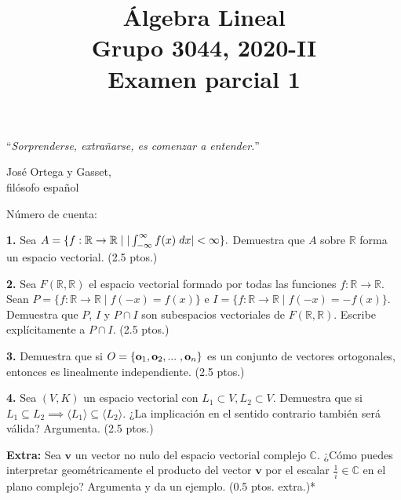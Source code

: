\documentclass[a4paper]{article}
\begin{document}
\title{Álgebra Lineal \\ Grupo 3044, 2020-II \\ Examen parcial 1}
\date{}
\maketitle

\epigraph{``\textit{Sorprenderse, extrañarse, es comenzar a entender.}''}{\textemdash José Ortega y Gasset, \\ filósofo español}

Número de cuenta:

\vspace{5mm}

\textbf{1.} Sea $A=\{f:\mathbb{R}\to\mathbb{R}\mid |\int_{-\infty}^{\infty} f(x)\hspace{1mm} dx| < \infty \}.$ Demuestra que $A$ sobre $\mathbb{R}$ forma un espacio vectorial. (2.5 ptos.)

\vspace{5mm}

\textbf{2.} Sea $F(\mathbb{R},\mathbb{R})$ el espacio vectorial formado por todas las funciones $f:\mathbb{R}\to \mathbb{R}$. Sean $P=\{f:\mathbb{R}\to \mathbb{R}\mid f(-x) = f(x)\}$ e $I=\{f:\mathbb{R}\to \mathbb{R}\mid f(-x)=-f(x)\}$. Demuestra que $P$, $I$ y $P\cap I$ son subespacios vectoriales de $F(\mathbb{R},\mathbb{R})$. Escribe explícitamente a $P\cap I$. (2.5 ptos.)

\vspace{5mm}

\textbf{3.} Demuestra que si $O=\{\mathbf{o}_1,\mathbf{o}_2,...\hspace{1mm} , \mathbf{o}_n\}$ es un conjunto de vectores ortogonales, entonces es linealmente independiente. (2.5 ptos.)

\vspace{5mm}

\textbf{4.} Sea $(V,K)$ un espacio vectorial con $L_1\subset V, L_2\subset V$. Demuestra que si $L_1\subseteq L_2\implies\langle L_1 \rangle \subseteq \langle L_2 \rangle.$ ¿La implicación en el sentido contrario también será válida? Argumenta. (2.5 ptos.)

\vspace{5mm}

\textbf{Extra:} Sea $\mathbf{v}$ un vector no nulo del espacio vectorial complejo $\mathbb{C}$. ¿Cómo puedes interpretar geométricamente el producto del vector $\mathbf{v}$ por el escalar $\frac{1}{i}\in\mathbb{C}$ en el plano complejo? Argumenta y da un ejemplo. (0.5 ptos. extra.)*
\end{document}
